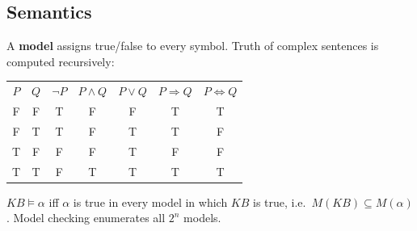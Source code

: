 \subsection{Semantics}
A \textbf{model} assigns true/false to every symbol. Truth of complex sentences is computed recursively:
\begin{center}\small
\begin{tabular}{cc|ccccc}
\rowcolor{navy}\color{gold}$P$&\color{gold}$Q$&\color{white}$\neg P$&\color{white}$P\wedge Q$&\color{white}$P\vee Q$&\color{white}$P\Rightarrow Q$&\color{white}$P\Leftrightarrow Q$\\
F&F&T&F&F&T&T\\ \rowcolor{ivory}F&T&T&F&T&T&F\\ T&F&F&F&T&\cellcolor{crimsonL}F&F\\ \rowcolor{ivory}T&T&F&T&T&T&T\\
\end{tabular}\end{center}
\begin{definition}[Entailment]
$KB\models\alpha$ iff $\alpha$ is true in every model in which $KB$ is true, i.e.\ $M(KB)\subseteq M(\alpha)$. Model checking enumerates all $2^{n}$ models.
\end{definition}


